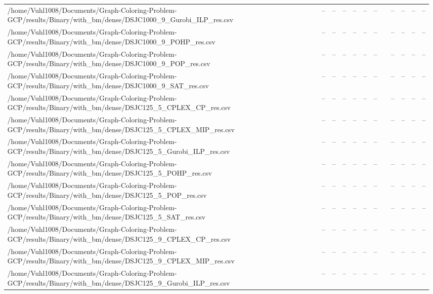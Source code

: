 \begin{table}[htbp]
\begin{tabular}{llllllllllll}
/home/Vuhl1008/Documents/Graph-Coloring-Problem-GCP/results/Binary/with\_bm/dense/DSJC1000\_9\_Gurobi\_ILP\_res.csv & -- & -- & -- & -- & -- & -- & {} & -- & -- & -- & -- \\
/home/Vuhl1008/Documents/Graph-Coloring-Problem-GCP/results/Binary/with\_bm/dense/DSJC1000\_9\_POHP\_res.csv & -- & -- & -- & -- & -- & -- & {} & -- & -- & -- & -- \\
/home/Vuhl1008/Documents/Graph-Coloring-Problem-GCP/results/Binary/with\_bm/dense/DSJC1000\_9\_POP\_res.csv & -- & -- & -- & -- & -- & -- & {} & -- & -- & -- & -- \\
/home/Vuhl1008/Documents/Graph-Coloring-Problem-GCP/results/Binary/with\_bm/dense/DSJC1000\_9\_SAT\_res.csv & -- & -- & -- & -- & -- & -- & {} & -- & -- & -- & -- \\
/home/Vuhl1008/Documents/Graph-Coloring-Problem-GCP/results/Binary/with\_bm/dense/DSJC125\_5\_CPLEX\_CP\_res.csv & -- & -- & -- & -- & -- & -- & {} & -- & -- & -- & -- \\
/home/Vuhl1008/Documents/Graph-Coloring-Problem-GCP/results/Binary/with\_bm/dense/DSJC125\_5\_CPLEX\_MIP\_res.csv & -- & -- & -- & -- & -- & -- & {} & -- & -- & -- & -- \\
/home/Vuhl1008/Documents/Graph-Coloring-Problem-GCP/results/Binary/with\_bm/dense/DSJC125\_5\_Gurobi\_ILP\_res.csv & -- & -- & -- & -- & -- & -- & {} & -- & -- & -- & -- \\
/home/Vuhl1008/Documents/Graph-Coloring-Problem-GCP/results/Binary/with\_bm/dense/DSJC125\_5\_POHP\_res.csv & -- & -- & -- & -- & -- & -- & {} & -- & -- & -- & -- \\
/home/Vuhl1008/Documents/Graph-Coloring-Problem-GCP/results/Binary/with\_bm/dense/DSJC125\_5\_POP\_res.csv & -- & -- & -- & -- & -- & -- & {} & -- & -- & -- & -- \\
/home/Vuhl1008/Documents/Graph-Coloring-Problem-GCP/results/Binary/with\_bm/dense/DSJC125\_5\_SAT\_res.csv & -- & -- & -- & -- & -- & -- & {} & -- & -- & -- & -- \\
/home/Vuhl1008/Documents/Graph-Coloring-Problem-GCP/results/Binary/with\_bm/dense/DSJC125\_9\_CPLEX\_CP\_res.csv & -- & -- & -- & -- & -- & -- & {} & -- & -- & -- & -- \\
/home/Vuhl1008/Documents/Graph-Coloring-Problem-GCP/results/Binary/with\_bm/dense/DSJC125\_9\_CPLEX\_MIP\_res.csv & -- & -- & -- & -- & -- & -- & {} & -- & -- & -- & -- \\
/home/Vuhl1008/Documents/Graph-Coloring-Problem-GCP/results/Binary/with\_bm/dense/DSJC125\_9\_Gurobi\_ILP\_res.csv & -- & -- & -- & -- & -- & -- & {} & -- & -- & -- & -- \\

\end{tabular}
\end{table}
